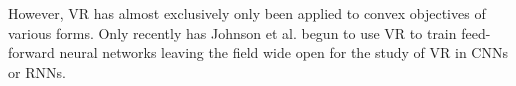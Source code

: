 \documentclass{article} %
\begin{document}
However, VR has almost exclusively only been applied to convex objectives of various forms.\cite{Shalev-Shwartz2015-SDCAwithoutDual,UniVR} Only recently has Johnson et al. begun to use VR to train feed-forward neural networks \cite{JohnsonZhang2013-SVRG} leaving the field wide open for the study of VR in CNNs or RNNs.




\end{document}
